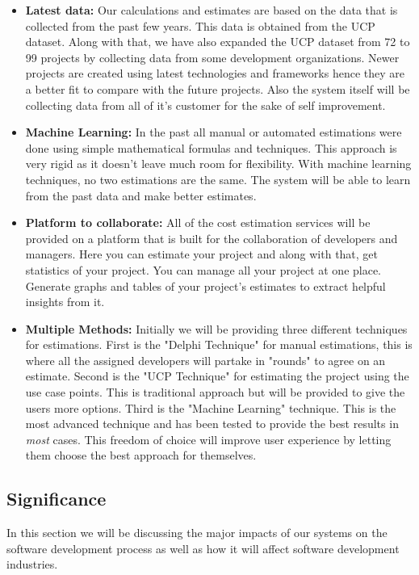 \begin{itemize}
	\item {\bfseries Latest data:} Our calculations and estimates are based on the data that is collected from the past few years. This data is obtained from the UCP dataset. Along with that, we have also expanded the UCP dataset from 72 to 99 projects by collecting data from some development organizations. Newer projects are created using latest technologies and frameworks hence they are a better fit to compare with the future projects. Also the system itself will be collecting data from all of it's customer for the sake of self improvement.
	
	
	\item {\bfseries Machine Learning:} In the past all manual or automated estimations were done using simple mathematical formulas and techniques. This approach is very rigid as it doesn't leave much room for flexibility. With machine learning techniques, no two estimations are the same. The system will be able to learn from the past data and make better estimates.
	

	\item {\bfseries Platform to collaborate:} All of the cost estimation services will be provided on a platform that is built for the collaboration of developers and managers. Here you can estimate your project and along with that, get statistics of your project. You can manage all your project at one place. Generate graphs and tables of your project's estimates to extract helpful insights from it.
	

	\item {\bfseries Multiple Methods:} Initially we will be providing three different techniques for estimations. First is the "Delphi Technique" for manual estimations, this is where all the assigned developers will partake in "rounds" to agree on an estimate. Second is the "UCP Technique" for estimating the project using the use case points. This is traditional approach but will be provided to give the users more options. Third is the "Machine Learning" technique. This is the most advanced technique and has been tested to provide the best results in {\it{most}} cases. This freedom of choice will improve user experience by letting them choose the best approach for themselves.
\end{itemize}


\subsection{Significance}
In this section we will be discussing the major impacts of our systems on the software development process as well as how it will affect software development industries.





